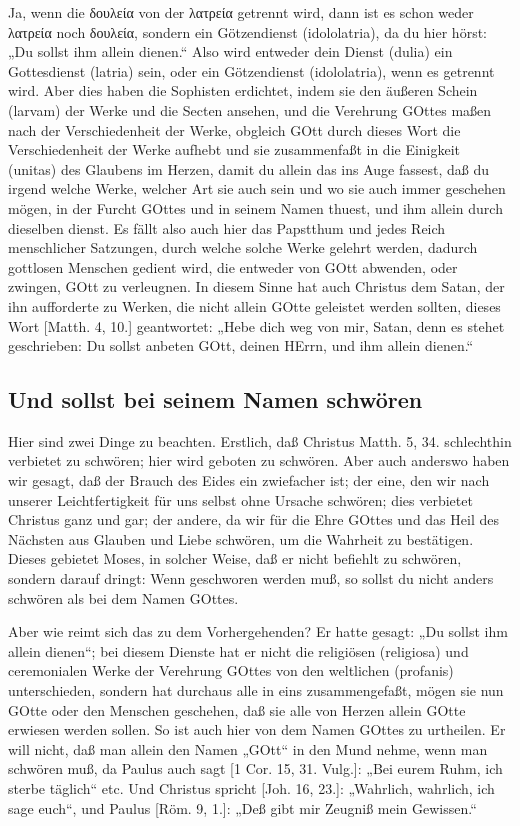 Ja, wenn die δουλεία von der λατρεία getrennt wird, dann ist es schon weder λατρεία noch δουλεία, sondern ein Götzendienst (idololatria), da du hier hörst: „Du sollst ihm allein dienen.“ Also wird entweder dein Dienst (dulia) ein Gottesdienst (latria) sein, oder ein Götzendienst (idololatria), wenn es getrennt wird. Aber dies haben die Sophisten erdichtet, indem sie den äußeren Schein (larvam) der Werke und die Secten ansehen, und die Verehrung GOttes maßen nach der Verschiedenheit der Werke, obgleich GOtt durch dieses Wort die Verschiedenheit der Werke aufhebt und sie zusammenfaßt in die Einigkeit (unitas) des Glaubens im Herzen, damit du allein das ins Auge fassest, daß du irgend welche Werke, welcher Art sie auch sein und wo sie auch immer geschehen mögen, in der Furcht GOttes und in seinem Namen thuest, und ihm allein durch dieselben dienst. Es fällt also auch hier das Papstthum und jedes Reich menschlicher Satzungen, durch welche solche Werke gelehrt werden, dadurch gottlosen Menschen gedient wird, die entweder von GOtt abwenden, oder zwingen, GOtt zu verleugnen. In diesem Sinne hat auch Christus dem Satan, der ihn aufforderte zu Werken, die nicht allein GOtte geleistet werden sollten, dieses Wort [Matth. 4, 10.] geantwortet: „Hebe dich weg von mir, Satan, denn es stehet geschrieben: Du sollst anbeten GOtt, deinen HErrn, und ihm allein dienen.“

\subsection{Und sollst bei seinem Namen schwören}

Hier sind zwei Dinge zu beachten. Erstlich, daß Christus Matth. 5, 34. schlechthin verbietet zu schwören; hier wird geboten zu schwören. Aber auch anderswo haben wir gesagt, daß der Brauch des Eides ein zwiefacher ist; der eine, den wir nach unserer Leichtfertigkeit für uns selbst ohne Ursache schwören; dies verbietet Christus ganz und gar; der andere, da wir für die Ehre GOttes und das Heil des Nächsten aus Glauben und Liebe schwören, um die Wahrheit zu bestätigen. Dieses gebietet Moses, in solcher Weise, daß er nicht befiehlt zu schwören, sondern darauf dringt: Wenn geschworen werden muß, so sollst du nicht anders schwören als bei dem Namen GOttes.

Aber wie reimt sich das zu dem Vorhergehenden? Er hatte gesagt: „Du sollst ihm allein dienen“; bei diesem Dienste hat er nicht die religiösen (religiosa) und ceremonialen Werke der Verehrung GOttes von den weltlichen (profanis) unterschieden, sondern hat durchaus alle in eins zusammengefaßt, mögen sie nun GOtte oder den Menschen geschehen, daß sie alle von Herzen allein GOtte erwiesen werden sollen. So ist auch hier von dem Namen GOttes zu urtheilen. Er will nicht, daß man allein den Namen „GOtt“ in den Mund nehme, wenn man schwören muß, da Paulus auch sagt [1 Cor. 15, 31. Vulg.]: „Bei eurem Ruhm, ich sterbe täglich“ etc. Und Christus spricht [Joh. 16, 23.]: „Wahrlich, wahrlich, ich sage euch“, und Paulus [Röm. 9, 1.]: „Deß gibt mir Zeugniß mein Gewissen.“

